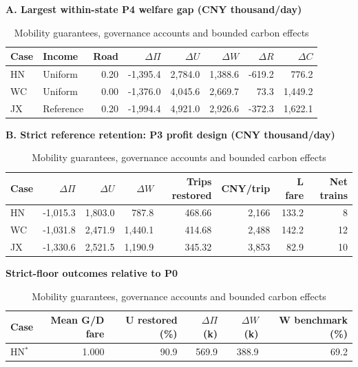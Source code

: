 \begin{table}[htbp]\centering
\caption{Mobility guarantees, governance accounts and bounded carbon effects}\label{tab:governance_robustness}
\begin{minipage}{.95\textwidth}\fontsize{8}{10}\selectfont{}\setlength{\tabcolsep}{2pt}\renewcommand{\arraystretch}{1.08}
\par\noindent\textbf{A. Largest within-state P4 welfare gap (CNY thousand/day)}\par\smallskip
\begin{tabular*}{\linewidth}{@{\extracolsep{\fill}}llrrrrrr@{}}\toprule
Case & Income & Road & $\Delta\Pi$ & $\Delta U$ & $\Delta W$ & $\Delta R$ & $\Delta C$ \\
\midrule
HN & Uniform & 0.20 & -1,395.4 & 2,784.0 & 1,388.6 & -619.2 & 776.2 \\
WC & Uniform & 0.00 & -1,376.0 & 4,045.6 & 2,669.7 & 73.3 & 1,449.2 \\
JX & Reference & 0.20 & -1,994.4 & 4,921.0 & 2,926.6 & -372.3 & 1,622.1 \\
\bottomrule\end{tabular*}\par\medskip
\par\noindent\textbf{B. Strict reference retention: P3 profit design (CNY thousand/day)}\par\smallskip
\begin{tabular*}{\linewidth}{@{\extracolsep{\fill}}lrrrrrrr@{}}\toprule
Case & $\Delta\Pi$ & $\Delta U$ & $\Delta W$ & Trips restored & CNY/trip & L fare & Net trains \\
\midrule
HN & -1,015.3 & 1,803.0 & 787.8 & 468.66 & 2,166 & 133.2 & 8 \\
WC & -1,031.8 & 2,471.9 & 1,440.1 & 414.68 & 2,488 & 142.2 & 12 \\
JX & -1,330.6 & 2,521.5 & 1,190.9 & 345.32 & 3,853 & 82.9 & 10 \\
\bottomrule\end{tabular*}\par\medskip
\par\noindent\textbf{Strict-floor outcomes relative to P0}\par\smallskip
\begin{tabular*}{\linewidth}{@{\extracolsep{\fill}}lrrrrr@{}}\toprule
Case & Mean G/D fare & U restored (\%) & $\Delta\Pi$ (k) & $\Delta W$ (k) & W benchmark (\%) \\
\midrule
HN$^{*}$ & 1.000 & 90.9 & 569.9 & 388.9 & 69.2 \\

\end{tabular*}
\end{minipage}
\end{table}

